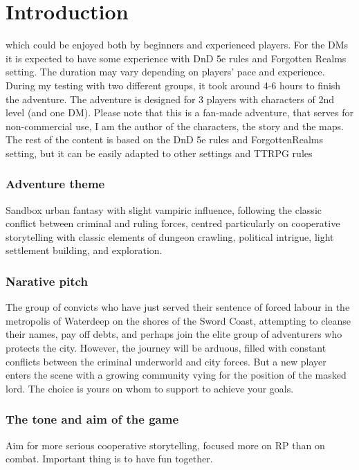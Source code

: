 \documentclass[10pt,onecolumn,twoside,openany,bg=full,layout=true]{dndbook}
\begin{document}
\tableofcontents

\mainmatter

\twocolumn
\chapter{Introduction}\label{ch:introduction}
which could be enjoyed both by beginners and experienced players.
For the DMs it is expected to have some experience with DnD 5e rules and Forgotten Realms setting.
The duration may vary depending on players' pace and experience.
During my testing with two different groups, it took around 4-6 hours to finish the adventure.
The adventure is designed for 3 players with characters of 2nd level (and one DM).
Please note that this is a fan-made adventure, that serves for non-commercial use, I am the author of the characters,
the story and the maps.
The rest of the content is based on the DnD 5e rules and ForgottenRealms setting, but it can be easily adapted to other
settings and TTRPG rules


\subsection*{Adventure theme}
Sandbox urban fantasy with slight vampiric influence, following the classic conflict between criminal and ruling forces,
centred particularly on cooperative storytelling with classic elements of dungeon crawling, political intrigue, light settlement building, and exploration.

\subsection*{Narative pitch}
The group of convicts who have just served their sentence of forced labour in the metropolis of Waterdeep on the shores of the Sword Coast,
attempting to cleanse their names, pay off debts, and perhaps join the elite group of adventurers who protects the city.
However, the journey will be arduous, filled with constant conflicts between the criminal underworld and city forces.
But a new player enters the scene with a growing community vying for the position of the masked lord.
The choice is yours on whom to support to achieve your goals.

\subsection*{The tone and aim of the game}
Aim for more serious cooperative storytelling, focused more on RP than on combat.
Important thing is to have fun together.
\end{document}
